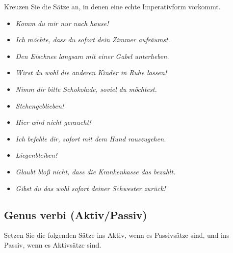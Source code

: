 \documentclass[12pt,a4paper,twoside]{article}
\begin{document}
Kreuzen Sie die Sätze an, in denen eine echte Imperativform vorkommt.

\begin{itemize}[label=\Square]\Lf
  \item[\Solcross] \textit{Komm du mir nur nach hause!}
  \item \textit{Ich möchte, dass du sofort dein Zimmer aufräumst.}
  \item \textit{Den Eischnee langsam mit einer Gabel unterheben.}
  \item \textit{Wirst du wohl die anderen Kinder in Ruhe lassen!}
  \item[\Solcross] \textit{Nimm dir bitte Schokolade, soviel du möchtest.}
  \item \textit{Stehengeblieben!}
  \item \textit{Hier wird nicht geraucht!}
  \item \textit{Ich befehle dir, sofort mit dem Hund rauszugehen.}
  \item \textit{Liegenbleiben!}
  \item[\Solcross] \textit{Glaubt bloß nicht, dass die Krankenkasse das bezahlt.}
  \item \textit{Gibst du das wohl sofort deiner Schwester zurück!}
\end{itemize}



\subsection{\morphologieaufgabe Genus verbi (Aktiv\slash Passiv)}

Setzen Sie die folgenden Sätze ins Aktiv, wenn es Passivsätze sind, und ins Passiv, wenn es Aktivsätze sind.
\end{document}
